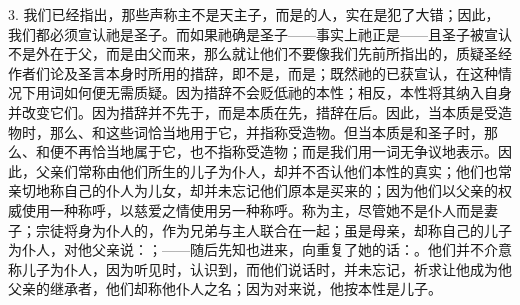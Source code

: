 3. 我们已经指出，那些声称主不是天主子，而是的人，实在是犯了大错；因此，我们都必须宣认祂是圣子。而如果祂确是圣子——事实上祂正是——且圣子被宣认不是外在于父，而是由父而来，那么就让他们不要像我们先前所指出的，质疑圣经作者们论及圣言本身时所用的措辞，即不是，而是；既然祂的已获宣认，在这种情况下用词如何便无需质疑。因为措辞不会贬低祂的本性；相反，本性将其纳入自身并改变它们。因为措辞并不先于，而是本质在先，措辞在后。因此，当本质是受造物时，那么、和这些词恰当地用于它，并指称受造物。但当本质是和圣子时，那么、和便不再恰当地属于它，也不指称受造物；而是我们用一词无争议地表示。因此，父亲们常称由他们所生的儿子为仆人，却并不否认他们本性的真实；他们也常亲切地称自己的仆人为儿女，却并未忘记他们原本是买来的；因为他们以父亲的权威使用一种称呼，以慈爱之情使用另一种称呼。称为主，尽管她不是仆人而是妻子；宗徒将身为仆人的，作为兄弟与主人联合在一起；虽是母亲，却称自己的儿子为仆人，对他父亲说：；——随后先知也进来，向重复了她的话：。他们并不介意称儿子为仆人，因为听见时，认识到，而他们说话时，并未忘记，祈求让他成为他父亲的继承者，他们却称他仆人之名；因为对来说，他按本性是儿子。\par

